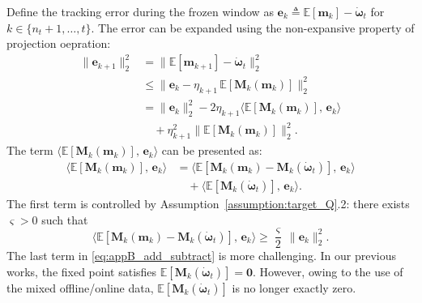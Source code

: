 \documentclass{IEEEtran}
\begin{document}
Define the tracking error during the frozen window as
$\boldsymbol{e}_{k}\triangleq \mathbb{E}[\boldsymbol{m}_{k}]-\dot{\boldsymbol{\omega}}_{t}$ for $k\in\{n_t+1,\ldots,t\}$.
The error can be expanded using the non-expansive property of projection oepration: 
\begin{equation}
\begin{aligned}
\|\boldsymbol{e}_{k+1}\|_2^2
&=\bigl\|\mathbb{E}[\boldsymbol{m}_{k+1}]-\dot{\boldsymbol{\omega}}_{t}\bigr\|_2^2\\
&\le \bigl\|\boldsymbol{e}_{k}-\eta_{k+1}\,\mathbb{E}[\boldsymbol{M}_{k}(\boldsymbol{m}_{k})]\bigr\|_2^2\\
&=\|\boldsymbol{e}_{k}\|_2^2-2\eta_{k+1}\big\langle \mathbb{E}[\boldsymbol{M}_{k}(\boldsymbol{m}_{k})],\,\boldsymbol{e}_{k}\big\rangle\\
&\quad+\eta_{k+1}^2\bigl\|\mathbb{E}[\boldsymbol{M}_{k}(\boldsymbol{m}_{k})]\bigr\|_2^2.
\end{aligned}
\label{eq:appB_recursion_raw}
\end{equation}
The term $\big\langle \mathbb{E}[\boldsymbol{M}_{k}(\boldsymbol{m}_{k})],\,\boldsymbol{e}_{k}\big\rangle$ can be presented as: 
\begin{equation}
\begin{aligned}
\big\langle \mathbb{E}[\boldsymbol{M}_{k}(\boldsymbol{m}_{k})],\,\boldsymbol{e}_{k}\big\rangle
&=\big\langle \mathbb{E}[\boldsymbol{M}_{k}(\boldsymbol{m}_{k})-\boldsymbol{M}_{k}(\dot{\boldsymbol{\omega}}_{t})],\,\boldsymbol{e}_{k}\big\rangle\\
&\quad+\big\langle \mathbb{E}[\boldsymbol{M}_{k}(\dot{\boldsymbol{\omega}}_{t})],\,\boldsymbol{e}_{k}\big\rangle.
\end{aligned}
\label{eq:appB_add_subtract}
\end{equation}
The first term is controlled by Assumption~\ref{assumption:target_Q}.2: 
there exists $\varsigma>0$ such that
\begin{equation}
\big\langle \mathbb{E}[\boldsymbol{M}_{k}(\boldsymbol{m}_{k})-\boldsymbol{M}_{k}(\dot{\boldsymbol{\omega}}_{t})],\,\boldsymbol{e}_{k}\big\rangle
\ge \frac{\varsigma}{2}\,\|\boldsymbol{e}_{k}\|_2^2.
\label{eq:appB_strong_mono}
\end{equation}
The last term in \eqref{eq:appB_add_subtract} is more challenging. In our previous works, the fixed point satisfies
$\mathbb{E}[\boldsymbol{M}_{k}(\dot{\boldsymbol{\omega}}_{t})]=\boldsymbol{0}$.
However, owing to the use of the mixed offline/online data, $\mathbb{E}[\boldsymbol{M}_{k}(\dot{\boldsymbol{\omega}}_{t})]$ is no longer exactly zero.
\end{document}
